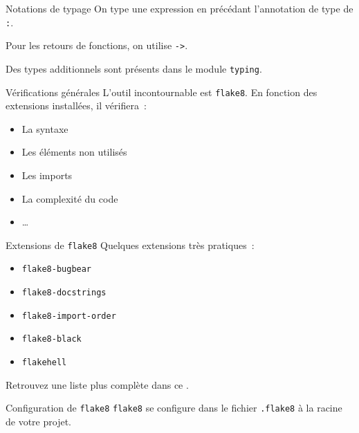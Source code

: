 \begin{frame}{Notations de typage}
  On type une expression en précédant l'annotation de type de \texttt{:}.

  Pour les retours de fonctions, on utilise \texttt{->}.


  Des types additionnels sont présents dans le module \texttt{typing}.
\end{frame}

\begin{frame}{Vérifications générales}
  L'outil incontournable est \texttt{flake8}. En fonction des extensions installées, il vérifiera~:

  \begin{itemize}
    \item La syntaxe
    \item Les éléments non utilisés
    \item Les imports
    \item La complexité du code
    \item …
  \end{itemize}
\end{frame}

\begin{frame}{Extensions de \texttt{flake8}}
  Quelques extensions très pratiques~:

  \begin{itemize}
    \item \texttt{flake8-bugbear}
    \item \texttt{flake8-docstrings}
    \item \texttt{flake8-import-order}
    \item \texttt{flake8-black}
    \item \texttt{flakehell}
  \end{itemize}

  Retrouvez une liste plus complète dans ce .
\end{frame}

\begin{frame}{Configuration de \texttt{flake8}}
  \texttt{flake8} se configure dans le fichier \texttt{.flake8} à la racine de votre projet.

\end{frame}

